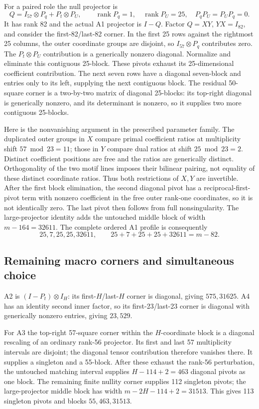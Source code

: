 For a paired role the null projector is
\[
 Q=I_{57}\otimes P_q+P_t\otimes P_U,\qquad
 \operatorname{rank}P_q=1,\quad \operatorname{rank}P_U=25,\quad
 P_qP_U=P_UP_q=0.
\]
It has rank 82 and the actual A1 projector is $I-Q$.
Factor $Q=XY$, $YX=I_{82}$, and consider the first-82/last-82 corner.
In the first 25 rows against the rightmost 25 columns, the outer
coordinate groups are disjoint, so $I_{57}\otimes P_q$ contributes
zero. The $P_t\otimes P_U$ contribution is a generically nonzero
diagonal. Normalize and eliminate this contiguous 25-block.
These pivots exhaust its 25-dimensional coefficient contribution.
The next seven rows have a diagonal seven-block and entries only to
its left, supplying the next contiguous block. The residual 50-square
corner is a two-by-two matrix of diagonal 25-blocks: its top-right
diagonal is generically nonzero, and its determinant is nonzero, so it
supplies two more contiguous 25-blocks.

Here is the nonvanishing argument in the prescribed parameter family.
The duplicated outer groups in $X$ compare primal coefficient ratios
at multiplicity shift $57\bmod23=11$; those in $Y$ compare dual ratios
at shift $25\bmod23=2$. Distinct coefficient positions are free and
the ratios are generically distinct. Orthogonality of the two motif
lines imposes their bilinear pairing, not equality of these distinct
coordinate ratios. Thus both restrictions of $X,Y$ are invertible.
After the first block elimination, the second diagonal pivot has a
reciprocal-first-pivot term with nonzero coefficient in the free outer
rank-one coordinates, so it is not identically zero. The last pivot
then follows from full nonsingularity. The large-projector identity
adds the untouched middle block of width $m-164=32611$. The complete
ordered A1 profile is consequently
\[
 25,7,25,25,32611,
 \qquad 25+7+25+25+32611=m-82.
\]

\subsection{Remaining macro corners and simultaneous choice}
A2 is $(I-P_t)\otimes I_H$: its first-$H$/last-$H$ corner is diagonal,
giving $575,31625$. A4 has an identity second inner factor, so its
first-23/last-23 corner is diagonal with generically nonzero entries,
giving $23,529$.

For A3 the top-right 57-square corner within the $H$-coordinate block
is a diagonal rescaling of an ordinary rank-56 projector. Its first
and last 57 multiplicity intervals are disjoint; the diagonal tensor
contribution therefore vanishes there. It supplies a singleton and
a 55-block. After these exhaust the rank-56 perturbation, the untouched
matching interval supplies $H-114+2=463$ diagonal pivots as one block.
The remaining finite nullity corner supplies 112 singleton pivots;
the large-projector middle block has width $m-2H-114+2=31513$.
This gives 113 singleton pivots and blocks $55,463,31513$.

